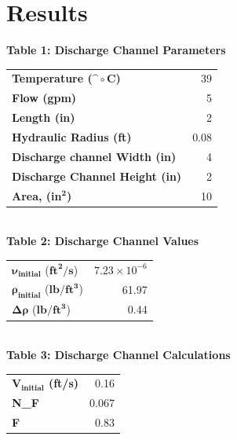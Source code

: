 \documentclass{article}
\begin{document}
\section{Results}
\begin{center}
{\bf {\large Table 1: Discharge Channel Parameters\\}}
\vspace{3mm}
\begin{tabular}{|l|r|}
\hline
\textbf{Temperature ($\bm^\circ$C)}             & 39    \\
\textbf{Flow (gpm)}                   & 5     \\
\textbf{Length (in)}                    & 2     \\
\textbf{Hydraulic Radius (ft)}       & 0.08  \\
\textbf{Discharge channel Width (in)}   & 4     \\
\textbf{Discharge Channel Height (in)} & 2     \\
\textbf{Area, (in$\bm{^2}$)}                 & 10    \\\hline
\end{tabular}
\vspace{5mm}
{\bf {\large \\Table 2: Discharge Channel Values\\}}
\vspace{3mm}
\begin{tabular}{|l|r|}
    \hline
    $\bm{\nu_\textbf{initial}}$ ($\bm{\textbf{ft}^2/\textbf{s}}$) & $7.23\times 10^{-6}$   \\
    $\bm{\rho_\textbf{initial}}$ ($\bm{\textbf{lb}/\textbf{ft}^3}$) & 61.97  \\
    $\bm{\Delta\rho}$ ($\bm{\textbf{lb}/\textbf{ft}^3}$)   & 0.44\\\hline 
\end{tabular}
\vspace{5mm}
{\bf {\large \\Table 3: Discharge Channel Calculations\\}}
\vspace{3mm}
\begin{tabular}{|l|r|}
    \hline
    \textbf{$\bm{V_\textbf{initial}}$ (ft/s)} & 0.16  \\
    \textbf{N\_F}              & 0.067  \\
    \textbf{F}                 & 0.83  \\

\end{tabular}
\end{center}
\end{document}

